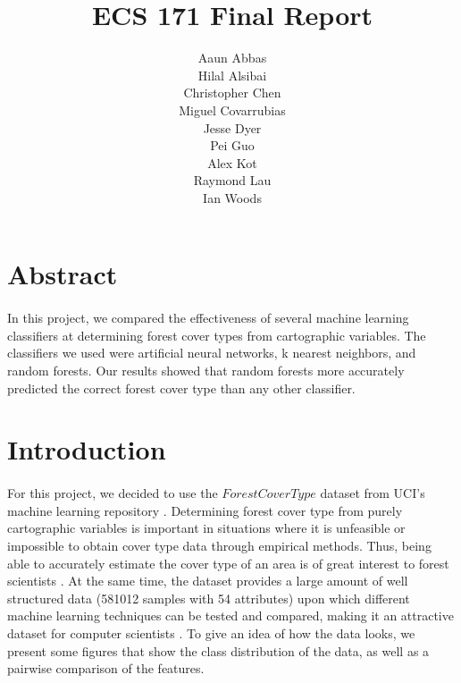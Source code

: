 \documentclass[12pt]{article}
\begin{document}
\begin{titlepage}
\title{\Huge ECS 171 Final Report}
\author{\huge Aaun Abbas\\\huge Hilal Alsibai\\\huge Christopher Chen\\\huge Miguel Covarrubias\\\huge Jesse Dyer\\\huge Pei Guo\\\huge Alex Kot\\\huge Raymond Lau\\\huge Ian Woods}
\date{}
\maketitle
\end{titlepage}

\section{Abstract}
\paragraph{}
In this project, we compared the effectiveness of several machine learning classifiers at determining forest cover types from cartographic variables. The classifiers we used were artificial neural networks, k nearest neighbors, and random forests. Our results showed that random forests more accurately predicted the correct forest cover type than any other classifier. 
\section{Introduction}
\paragraph{}
For this project, we decided to use the $Forest CoverType$ dataset from UCI's machine learning repository \cite{bache13}. Determining forest cover type from purely cartographic variables is important in situations where it is unfeasible or impossible to obtain cover type data through empirical methods. Thus, being able to accurately estimate the cover type of an area is of great interest to forest scientists \cite{blackard00, ross04}.  At the same time, the dataset provides a large amount of well structured data (581012 samples with 54 attributes) upon which different machine learning techniques can be tested and compared, making it an attractive dataset for computer scientists \cite{gama03,oza01,giannella,furnkranz,obradovic,klami}. To give an idea of how the data looks, we present some figures that show the class distribution of the data, as well as a pairwise comparison of the features.
\end{document}
